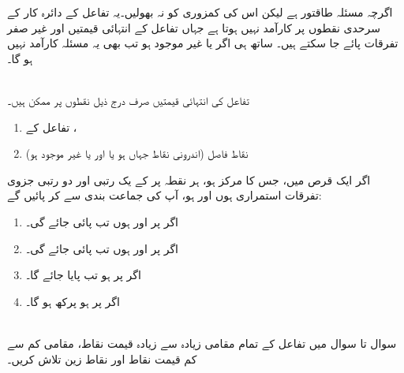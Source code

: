   اگرچہ مسئلہ    طاقتور  ہے لیکن  اس کی کمزوری کو  نہ بھولیں۔یہ تفاعل کے دائرہ کار کے سرحدی نقطوں پر کارآمد نہیں ہوتا ہے جہاں تفاعل کے انتہائی قیمتیں اور غیر صفر تفرقات پائے جا  سکتے   ہیں۔  ساتھ ہی  اگر  یا  غیر موجود ہو تب بھی یہ مسئلہ کارآمد نہیں ہو گا۔
 
\\
تفاعل  کی انتہائی قیمتیں صرف درج ذیل نقطوں پر ممکن ہیں۔
\begin{enumerate}[1.]
\item
تفاعل  کے ،
\item
نقاط فاصل (اندرونی نقاط جہاں  ہو یا  اور یا   غیر موجود ہو) 
\end{enumerate}
اگر ایک قرص  میں، جس کا مرکز  ہو، ہر نقطہ پر   کے یک رتبی اور دو رتبی جزوی تفرقات استمراری ہوں اور  ہو، آپ   کی  جماعت بندی  سے کر پائیں گے:
\begin{enumerate}[1.]
\item
اگر  پر  اور  ہوں تب پائی جائے گی۔
\item
اگر  پر  اور  ہوں تب  پائی جائے گی۔
\item
اگر  پر  ہو تب   پایا جائے گا۔
\item
اگر  پر  ہو پرکھ   ہو گا۔
\end{enumerate}


\\
سوال  تا سوال   میں تفاعل کے  تمام مقامی زیادہ سے زیادہ قیمت  نقاط، مقامی کم سے کم قیمت  نقاط  اور نقاط زین تلاش کریں۔

